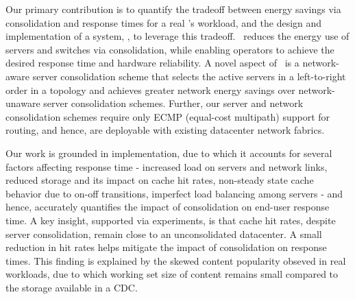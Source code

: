Our primary contribution is to quantify the tradeoff between energy savings via consolidation and response times for a real \cdc's workload, and the design and implementation of a system, \shrink, to leverage this tradeoff. \shrink\ reduces the energy use of servers and switches via consolidation, while enabling operators to achieve the desired response time and hardware reliability. A novel aspect of \shrink\ is a network-aware server consolidation scheme that selects the active servers in a left-to-right order in a topology and achieves greater network energy savings over network-unaware server consolidation schemes. Further, our server and network consolidation schemes require only ECMP (equal-cost multipath) support for routing, and hence, are deployable with existing datacenter network fabrics.

Our work is grounded in implementation, due to which it accounts for several factors affecting response time - increased load on servers and network links, reduced storage and its impact on cache hit rates, non-steady state cache behavior due to on-off transitions, imperfect load balancing among servers - and hence, accurately quantifies the impact of consolidation on end-user response time. A key insight, supported via experiments, is that cache hit rates, despite server consolidation, remain close to an unconsolidated datacenter. A small reduction in hit rates helps mitigate the impact of consolidation on response times. This finding is explained by the skewed content popularity obseved in real workloads, due to which working set size of content remains small compared to the storage available in a CDC.








